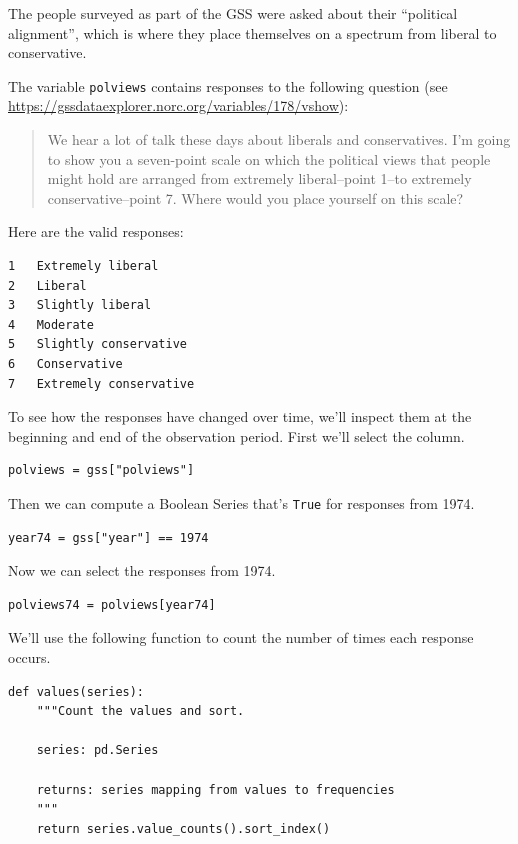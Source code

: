 The people surveyed as part of the GSS were asked about their
``political alignment'', which is where they place themselves on a
spectrum from liberal to conservative.

The variable \passthrough{\lstinline!polviews!} contains responses to
the following question (see
\url{https://gssdataexplorer.norc.org/variables/178/vshow}):

\begin{quote}
We hear a lot of talk these days about liberals and conservatives. I'm
going to show you a seven-point scale on which the political views that
people might hold are arranged from extremely liberal--point 1--to
extremely conservative--point 7. Where would you place yourself on this
scale?
\end{quote}

Here are the valid responses:

\begin{lstlisting}
1   Extremely liberal
2   Liberal
3   Slightly liberal
4   Moderate
5   Slightly conservative
6   Conservative
7   Extremely conservative
\end{lstlisting}

To see how the responses have changed over time, we'll inspect them at
the beginning and end of the observation period. First we'll select the
column.

\begin{lstlisting}[]
polviews = gss["polviews"]
\end{lstlisting}

Then we can compute a Boolean Series that's
\passthrough{\lstinline!True!} for responses from 1974.

\begin{lstlisting}[]
year74 = gss["year"] == 1974
\end{lstlisting}

Now we can select the responses from 1974.

\begin{lstlisting}[]
polviews74 = polviews[year74]
\end{lstlisting}

We'll use the following function to count the number of times each
response occurs.

\begin{lstlisting}[]
def values(series):
    """Count the values and sort.

    series: pd.Series

    returns: series mapping from values to frequencies
    """
    return series.value_counts().sort_index()
\end{lstlisting}


